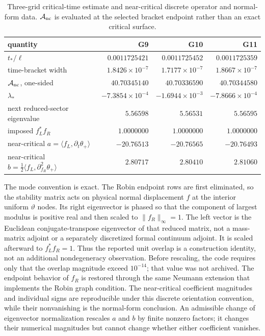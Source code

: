 \documentclass[11pt]{article}
\begin{document}
\begin{table}[ht]
\centering
\caption{Three-grid critical-time estimate and near-critical discrete operator
and normal-form data.  $\mathcal A_{\rm nc}$ is evaluated at the selected
bracket endpoint rather than an exact critical surface.}
\label{tab:supp-critical}
\begin{tabular}{@{}lrrr@{}}
\toprule
quantity & G9 & G10 & G11 \\
\midrule
$t_*/\ell$ & $0.0011725421$ & $0.0011725452$ & $0.0011725359$ \\
time-bracket width & $1.8426\times10^{-7}$ & $1.7177\times10^{-7}$ & $1.8667\times10^{-7}$ \\
$\mathcal A_{\rm nc}$, one-sided & $40.70345140$ & $40.70336590$ & $40.70344580$ \\
$\lambda_*$ & $-7.3854\times10^{-4}$ & $-1.6944\times10^{-3}$ & $-7.8666\times10^{-4}$ \\
next reduced-sector eigenvalue & $5.56598$ & $5.56531$ & $5.56595$ \\
imposed $f_L^*f_R$ & $1.0000000$ & $1.0000000$ & $1.0000000$ \\
near-critical $a=\langle f_L,\partial_t\theta_+\rangle$ & $-20.76513$ & $-20.76565$ & $-20.76493$ \\
near-critical $b=\tfrac12\langle f_L,\partial_{f_R}^2\theta_+\rangle$ & $2.80717$ & $2.80410$ & $2.81060$ \\
\bottomrule
\end{tabular}
\end{table}

The mode convention is exact.  The Robin endpoint rows are first eliminated,
so the stability matrix acts on physical normal displacement $f$ at the
interior uniform $\vartheta$ nodes.  Its right eigenvector is phased so that
the component of largest modulus is positive real and then scaled to
$\|f_R\|_\infty=1$.  The left vector is the Euclidean
conjugate-transpose eigenvector of that reduced matrix, not a mass-matrix
adjoint or a separately discretized formal continuum adjoint.  It is scaled
afterward to $f_L^*f_R=1$.  Thus the reported unit overlap is a construction
identity, not an additional nondegeneracy observation.  Before rescaling, the
code requires only that the overlap magnitude exceed $10^{-14}$; that value
was not archived.  The endpoint behavior of $f_R$ is restored through the
same Neumann extension that implements the Robin graph condition.  The
near-critical coefficient magnitudes and individual signs are reproducible
under this discrete orientation convention, while their nonvanishing is the
normal-form conclusion.
An admissible change of eigenvector normalization rescales $a$ and $b$ by
finite nonzero factors; it changes their numerical magnitudes but cannot
change whether either coefficient vanishes.
\end{document}
